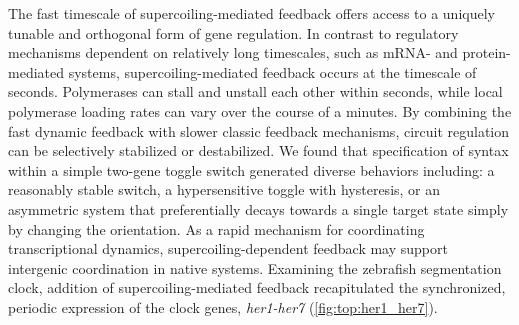 \documentclass[11pt]{article}
\begin{document}
 The fast timescale of supercoiling-mediated feedback offers access to a uniquely tunable and orthogonal form of gene regulation. In contrast to regulatory mechanisms dependent on relatively long timescales, such as mRNA- and protein-mediated systems, supercoiling-mediated feedback occurs at the timescale of seconds. Polymerases can stall and unstall each other within seconds, while local polymerase loading rates can vary over the course of a minutes. By combining the fast dynamic feedback with slower classic feedback mechanisms, circuit regulation can be selectively stabilized or destabilized. We found that specification of syntax within a simple two-gene toggle switch generated diverse behaviors including: a reasonably stable switch, a hypersensitive toggle with hysteresis, or an asymmetric system that preferentially decays towards a single target state simply by changing the orientation.
As a rapid mechanism for coordinating transcriptional dynamics, supercoiling-dependent feedback may support intergenic coordination in native systems. Examining the zebrafish segmentation clock, addition of supercoiling-mediated feedback recapitulated the synchronized, periodic expression of the clock genes, \textit{her1-her7} (\cref{fig:top:her1_her7}). 
\end{document}
